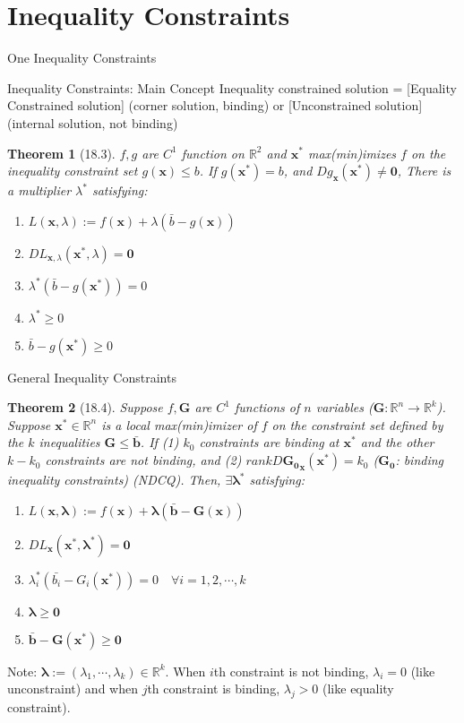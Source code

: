 \documentclass[a4paper,11pt]{article}
\newtheorem{thm}{Theorem}
\newcommand{\bb}{\mathbb}
\newcommand{\bd}{\mathbf}
\begin{document}
\section{Inequality Constraints} %
\label{sec:inequality_constraints}
\begin{frame}[t]{One Inequality Constraints}
	\begin{block}
		{Inequality Constraints: Main Concept}
		Inequality constrained solution = [Equality Constrained solution] (corner solution, binding) or [Unconstrained solution] (internal solution, not binding)
	\end{block}
	\begin{thm}
		[18.3] $f,g$ are $C^1$ function on $\bb{R}^2$ and $\bd{x^\ast}$ max(min)imizes $f$ on the inequality constraint set $g(\bd{x})\le b$. If $g(\bd{x^\ast})=b$, and $Dg_{\bd{x}}(\bd{x^\ast})\neq \bd{0}$, There is a multiplier $\lambda^\ast$ satisfying:
		\begin{enumerate}
			\item $L(\bd{x},\lambda):=f(\bd{x})+\lambda(\bar{b}-g(\bd{x}))$
			\item $DL_{\bd{x},\lambda}(\bd{x^\ast},\lambda)=\bd{0}$
			\item $\lambda^\ast(\bar{b}-g(\bd{x^\ast}))=0$
			\item $\lambda^\ast\ge 0$
			\item $\bar{b}-g(\bd{x^\ast})\ge 0$
		\end{enumerate}
	\end{thm}
\end{frame}

\begin{frame}[t]{General Inequality Constraints}
	\begin{thm}
		[18.4] Suppose $f,\bd{G}$ are $C^1$ functions of $n$ variables ($\bd{G}:\bb{R}^n\rightarrow\bb{R}^k$). Suppose $\bd{x^\ast}\in\bb{R}^n$ is a local max(min)imizer of $f$ on the constraint set defined by the $k$  inequalities $\bd{G}\le \bar{\bd{b}}$. If (1) $k_0$ constraints are binding at $\bd{x^\ast}$ and the other $k-k_0$ constraints are not binding, and (2) $rank D\bd{G_0}_{\bd{x}}(\bd{x^\ast})= k_0$ ($\bd{G_0}$: binding inequality constraints) (NDCQ). Then, $\exists\bd{\lambda^\ast}$ satisfying:
		\begin{enumerate}
			\item $L(\bd{x},\bd{\lambda}):=f(\bd{x})+\bd{\lambda}(\bar{\bd{b}}-\bd{G}(\bd{x}))$
			\item $DL_{\bd{x}}(\bd{x^\ast,\lambda^\ast})=\bd{0}$
			\item ${\lambda_i^\ast}(\bar{{b_i}}-{G_i}(\bd{x^\ast}))={0}\quad \forall i = 1,2,\cdots, k$
			\item $\bd{\lambda}\ge \bd{0}$
			\item $\bar{\bd{b}}-\bd{G}(\bd{x^\ast})\ge \bd{0}$
		\end{enumerate}
	\end{thm}
	Note: $\bd{\lambda}:=(\lambda_1,\cdots,\lambda_k)\in \bb{R}^k$. When $i$th constraint is not binding, $\lambda_i=0$ (like unconstraint) and when $j$th constraint is binding, $\lambda_j> 0$ (like equality constraint).
\end{frame}
\end{document}
